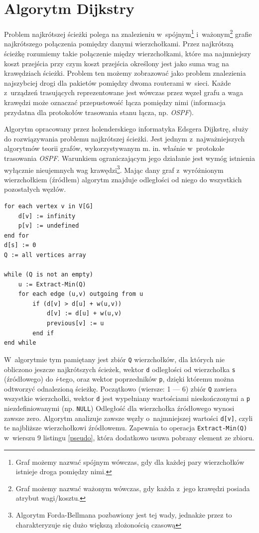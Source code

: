 \documentclass[a4paper,12pt,polish,oneside,openright]{thesis}
\newcommand\code[1]{\lstinline[style=line]{#1}}
\begin{document}
\section{Algorytm Dijkstry}
\label{chap:dijkstra_theory}
Problem najkrótszej ścieżki polega na znalezieniu w~spójnym\footnote{Graf możemy nazwać spójnym wówczas, gdy dla każdej pary wierzchołków istnieje droga pomiędzy nimi.} i~ważonym\footnote{Graf możemy nazwać ważonym wówczas, gdy każda z~jego krawędzi posiada atrybut wagi/kosztu.} grafie najkrótszego połączenia pomiędzy danymi wierzchołkami.
Przez najkrótszą ścieżkę rozumiemy takie połączenie między wierzchołkami, które ma najmniejszy koszt przejścia przy czym koszt przejścia określony jest jako suma wag na krawędziach ścieżki\cite{dijkstra}.
Problem ten możemy zobrazować jako problem znalezienia najszybciej drogi dla pakietów pomiędzy dwoma routerami w~sieci.
Każde z~urządzeń trasujących reprezentowane jest wówczas przez węzeł grafu a waga krawędzi może oznaczać przepustowość łącza pomiędzy nimi (informacja przydatna dla protokołów trasowania stanu łącza, np. \emph{OSPF}\cite{ospf}).

Algorytm opracowany przez holenderskiego informatyka Edsgera Dijkstrę, służy do rozwiązywania problemu najkrótszej ścieżki.
Jest jednym z~najważniejszych algorytmów teorii grafów, wykorzystywanym m. in. właśnie w~protokole trasowania \emph{OSPF}.
Warunkiem ograniczającym jego działanie jest wymóg istnienia wyłącznie nieujemnych wag krawędzi\footnote{Algorytm Forda-Bellmana pozbawiony jest tej wady, jednakże przez to charakteryzuje się dużo większą złożonością czasową\cite{graphtheory}}.
Mając dany graf z~wyróżnionym wierzchołkiem (źródłem) algorytm znajduje odległości od niego do wszystkich pozostałych węzłów.

\begin{lstlisting}[style=code,caption=Pseudokod algorytmu Dijkstry\cite{dijkstra},label=pseudo]
for each vertex v in V[G]
	d[v] := infinity
	p[v] := undefined
end for
d[s] := 0
Q := all vertices array

while (Q is not an empty)
	u := Extract-Min(Q)
	for each edge (u,v) outgoing from u
		if (d[v] > d[u] + w(u,v))
			d[v] := d[u] + w(u,v)
			previous[v] := u
		end if
end while
\end{lstlisting}
W~algorytmie tym pamiętany jest zbiór \code{Q} wierzchołków, dla których nie obliczono jeszcze najkrótszych ścieżek, wektor \code{d} odległości od wierzchołka \code{s} (źródłowego) do \emph{i}-tego, oraz wektor poprzedników \code{p}, dzięki któremu można odtworzyć odnalezioną ścieżkę.
Początkowo (wiersze: 1 --- 6) zbiór \code{Q} zawiera wszystkie wierzchołki, wektor \code{d} jest wypełniany wartościami nieskończonymi a \code{p} niezdefiniowanymi (np. \code{NULL})
Odległość dla wierzchołka źródłowego wynosi zawsze zero.
Algorytm analizuje zawsze węzły o~najmniejszej wartości \code{d[v]}, czyli te najbliższe wierzchołkowi źródłowemu.
Zapewnia to operacja \code{Extract-Min(Q)} w~wierszu 9 listingu \ref{pseudo}, która dodatkowo usuwa pobrany element ze zbioru.
\end{document}
